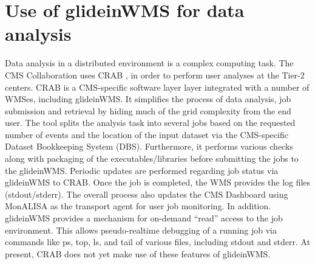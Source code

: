 \documentclass[a4paper]{jpconf}
\begin{document}
\section{Use of glideinWMS for data analysis}
Data analysis in a distributed environment is a complex computing task. The CMS Collaboration
uses CRAB \cite{bib:cms_crab}, in order to perform user analyses at the Tier-2 centers.
CRAB is a CMS-specific software layer layer integrated with a number of WMSes, including glideinWMS.
It simplifies the process of data analysis, job submission and retrieval by hiding much of the grid complexity from the
end user. The tool splits the analysis task into several jobs based on the requested number of events and
the location of the input dataset via the CMS-specific Dataset Bookkeeping System (DBS). Furthermore, it performs various checks along with 
packaging of the executables/libraries before submitting the jobs to the glideinWMS. 
Periodic updates are performed regarding job status via glideinWMS to CRAB. Once the job is completed, the WMS provides the 
log files (stdout/stderr). The overall process also updates the CMS Dashboard using MonALISA as the transport agent for user job monitoring.
In addition. glideinWMS provides a mechanism for on-demand ``read'' access to the job environment. This allows
pseudo-realtime debugging of a running job via commands like ps, top, ls, and tail of various files, including stdout and stderr. 
At present, CRAB does not yet make use of these features of glideinWMS.
\end{document}
